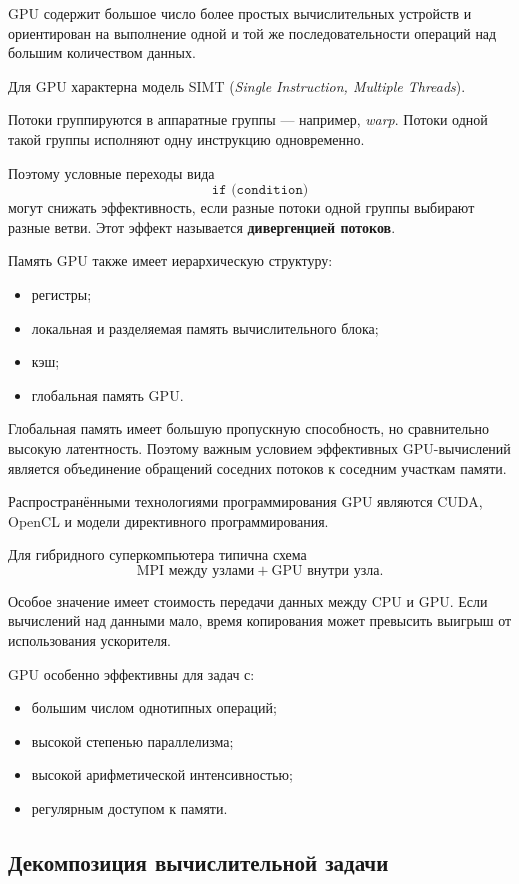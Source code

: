 GPU содержит большое число более простых вычислительных устройств и ориентирован
на выполнение одной и той же последовательности операций над большим количеством
данных.

Для GPU характерна модель SIMT
(\textit{Single Instruction, Multiple Threads}).

Потоки группируются в аппаратные группы --- например, \textit{warp}.
Потоки одной такой группы исполняют одну инструкцию одновременно.

Поэтому условные переходы вида
\[
\texttt{if (condition)}
\]
могут снижать эффективность, если разные потоки одной группы выбирают разные ветви.
Этот эффект называется \textbf{дивергенцией потоков}.

Память GPU также имеет иерархическую структуру:
\begin{itemize}
	\item регистры;
	\item локальная и разделяемая память вычислительного блока;
	\item кэш;
	\item глобальная память GPU.
\end{itemize}

Глобальная память имеет большую пропускную способность, но сравнительно высокую
латентность. Поэтому важным условием эффективных GPU-вычислений является
объединение обращений соседних потоков к соседним участкам памяти.

Распространёнными технологиями программирования GPU являются CUDA,
OpenCL и модели директивного программирования.

Для гибридного суперкомпьютера типична схема
\[
\text{MPI между узлами}
+
\text{GPU внутри узла}.
\]

Особое значение имеет стоимость передачи данных между CPU и GPU.
Если вычислений над данными мало, время копирования может превысить выигрыш
от использования ускорителя.

GPU особенно эффективны для задач с:
\begin{itemize}
	\item большим числом однотипных операций;
	\item высокой степенью параллелизма;
	\item высокой арифметической интенсивностью;
	\item регулярным доступом к памяти.
\end{itemize}

\subsection{Декомпозиция вычислительной задачи}

